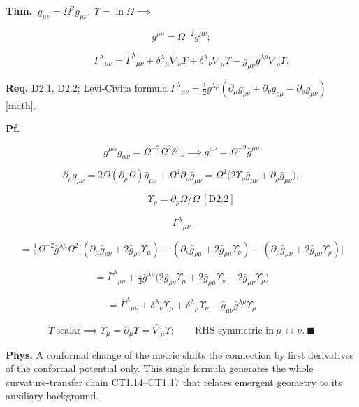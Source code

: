 \begin{theorem}\label{tag:CT1-13}
\textbf{Thm.} $\ g_{\mu\nu}=\Omega^2\bar g_{\mu\nu},\ \Upsilon=\ln\Omega\implies$

\[
g^{\mu\nu}=\Omega^{-2}\bar g^{\mu\nu};
\]

\[
\qquad \Gamma^\lambda{}_{\mu\nu}=\bar\Gamma^\lambda{}_{\mu\nu}+\delta^\lambda{}_\mu\bar\nabla_\nu\Upsilon+\delta^\lambda{}_\nu\bar\nabla_\mu\Upsilon-\bar g_{\mu\nu}\bar g^{\lambda\rho}\bar\nabla_\rho\Upsilon .
\]

\textbf{Req.} D2.1, D2.2; Levi-Civita formula $\Gamma^\lambda{}_{\mu\nu}=\tfrac12g^{\lambda\rho}(\partial_\mu g_{\rho\nu}+\partial_\nu g_{\rho\mu}-\partial_\rho g_{\mu\nu})$ [math].

\textbf{Pf.}

\[
g^{\mu\alpha}g_{\alpha\nu}=\Omega^{-2}\Omega^2\delta^\mu{}_\nu\implies g^{\mu\nu}=\Omega^{-2}\bar g^{\mu\nu}
\]

\[
\partial_\rho g_{\mu\nu}=2\Omega(\partial_\rho\Omega)\bar g_{\mu\nu}+\Omega^2\partial_\rho\bar g_{\mu\nu}=\Omega^2\bigl(2\Upsilon_\rho\bar g_{\mu\nu}+\partial_\rho\bar g_{\mu\nu}\bigr),
\]

\[
\qquad \Upsilon_\rho=\partial_\rho\Omega/\Omega\ [\mathrm{D2.2}]
\]

\[
\Gamma^\lambda{}_{\mu\nu}
\]

\[
= \tfrac12\Omega^{-2}\bar g^{\lambda\rho}\Omega^2\bigl[(\partial_\mu\bar g_{\rho\nu}+2\bar g_{\rho\nu}\Upsilon_\mu)+(\partial_\nu\bar g_{\rho\mu}+2\bar g_{\rho\mu}\Upsilon_\nu)-(\partial_\rho\bar g_{\mu\nu}+2\bar g_{\mu\nu}\Upsilon_\rho)\bigr]
\]

\[
= \bar\Gamma^\lambda{}_{\mu\nu}+\tfrac12\bar g^{\lambda\rho}\bigl(2\bar g_{\rho\nu}\Upsilon_\mu+2\bar g_{\rho\mu}\Upsilon_\nu-2\bar g_{\mu\nu}\Upsilon_\rho\bigr)
\]

\[
= \bar\Gamma^\lambda{}_{\mu\nu}+\delta^\lambda{}_\nu\Upsilon_\mu+\delta^\lambda{}_\mu\Upsilon_\nu-\bar g_{\mu\nu}\bar g^{\lambda\rho}\Upsilon_\rho
\]

\[
\Upsilon\ \text{scalar}\implies\Upsilon_\mu=\partial_\mu\Upsilon=\bar\nabla_\mu\Upsilon;\qquad\text{RHS symmetric in}\ \mu\leftrightarrow\nu.\ \blacksquare
\]

\textbf{Phys.} A conformal change of the metric shifts the connection by first derivatives of the conformal potential only. This single formula generates the whole curvature-transfer chain CT1.14–CT1.17 that relates emergent geometry to its auxiliary background.

\end{theorem}

